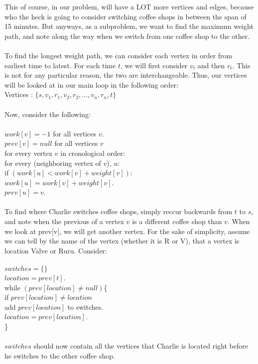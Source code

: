 \documentclass[11pt]{article}
\begin{document}
\newpage
\noindent
This of course, in our problem, will have a LOT more vertices and edges, because who the heck is going to consider switching coffee shops in between the span of 15 minutes. But anyways, as a subproblem, we want to find the maximum weight path, and note along the way when we switch from one coffee shop to the other. \\
\\
To find the longest weight path, we can consider each vertex in order from earliest time to latest. For each time $t$, we will first consider $v_t$ and then $r_t$. This is not for any particular reason, the two are interchangeable. Thus, our vertices will be looked at in our main loop in the following order:\\
Vertices : $\{s, v_1, r_1, v_2, r_2, ..., v_n, r_n, t\}$\\
\\
Now, consider the following:\\
\\
$work[v] = -1$ for all vertices $v$.\\
$prev[v] = null$ for all vertices $v$\\
for every vertex $v$ in cronological order:\\
\indent for every (neighboring vertex of $v$), $u$:\\
\indent \indent if $(work[u] < work[v] + weight[v])$:\\
\indent \indent \indent $work[u] = work[v] + weight[v]$.\\
\indent \indent \indent $prev[u] = v$.\\
\\
To find where Charlie switches coffee shops, simply reccur backwards from $t$ to $s$, and note when the previous of a vertex $v$ is a different coffee shop than $v$. When we look at prev[v], we will get another vertex. For the sake of simplicity, assume we can tell by the name of the vertex (whether it is R or V), that a vertex is location Valve or Ruru. Consider:\\
\\
$switches = \{\}$\\
$location = prev[t]$.\\
while $(prev[location] \neq null)$\{\\
\indent if $prev[location] \neq location$\\
\indent \indent add $prev[location]$ to switches.\\
\indent $location = prev[location]$.\\
\}\\
\\
$switches$ should now contain all the vertices that Charlie is located right before he switches to the other coffee shop.
\end{document}
